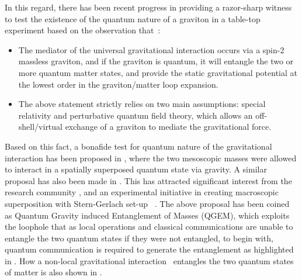 \documentclass[%
 12pt,
 superscriptaddress,
 amsmath,
 amssymb,
 onecolumn,
 longbibliography
]{revtex4-2}
\begin{document}
In this regard, there has been recent progress in providing a razor-sharp witness to test the existence of the quantum nature of a graviton in a table-top experiment based on the observation that~\cite{marshman2020locality}:
\begin{itemize}
    \item The mediator of the universal gravitational interaction occurs via a spin-2 massless graviton, and if the graviton is quantum, it will entangle the two or more quantum matter states, and provide the static gravitational potential at the lowest order in the graviton/matter loop expansion. 
    \item The above statement strictly relies on two main assumptions: special relativity and perturbative quantum field theory, which allows an off-shell/virtual exchange of a graviton to mediate the gravitational force. 
    
\end{itemize}
\indent Based on this fact, a bonafide test for quantum nature of the gravitational interaction has been proposed in \cite{Bose2017}, where the two mesoscopic masses were allowed to interact in a spatially superposed quantum state via gravity. A similar proposal has also been made in \cite{Marletto2017}. This has attracted significant interest from the research community \cite{Belenchia2018, Christodoulou_2020, howl2020testing, Chevalier:2020uvv, Nguyen2019, Kamp2020,Chevalier:2020uvv, torovs2020relative,Miki:2020hvg,Matsumura:2020law,Rijavec:2020qxd,Toros:2020krn}, and an experimental initiative in creating macroscopic superposition with Stern-Gerlach set-up ~\cite{Margalit:2020qcy}. The above proposal has been coined as  Quantum Gravity induced Entanglement of Masses (QGEM), which exploits the loophole that as local operations and classical communications are unable to entangle the two quantum states if they were not entangled, to begin with, quantum communication is required to generate the entanglement as highlighted in \cite{marshman2020locality}. How a non-local gravitational interaction~\cite{Biswas:2011ar,Biswas:2005qr} entangles the two quantum states of matter is also shown in \cite{marshman2020locality}.
\end{document}
